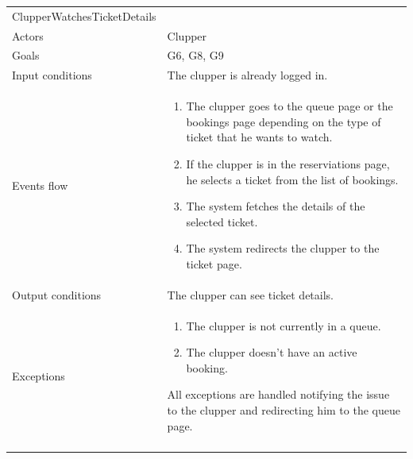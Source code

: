 \begin{longtable}[]{@{}
  >{\raggedright\arraybackslash}p{}
  >{\raggedright\arraybackslash}p{}@{}}
\toprule
ClupperWatchesTicketDetails & \\ \addlinespace
\midrule
\endhead
Actors & Clupper \\ \addlinespace
Goals & G6, G8, G9 \\ \addlinespace
Input conditions & The clupper is already logged in. \\ \addlinespace
Events flow & \begin{enumerate}\vspace{-1.35\baselineskip}
    \item The clupper goes to the queue page or the bookings page depending on the type of ticket that he wants to watch.
    \item If the clupper is in the reserviations page, he selects a ticket from the list of bookings.
    \item The system fetches the details of the selected ticket.
    \item The system redirects the clupper to the ticket page. 
\vspace{-1.0\baselineskip}\end{enumerate} \\ \addlinespace
Output conditions & The clupper can see ticket details. \\ \addlinespace
Exceptions & \begin{enumerate}\vspace{-1.35\baselineskip}
\item The clupper is not currently in a queue. 
\item The clupper doesn't have an active booking.
\end{enumerate} All exceptions are handled notifying the issue to the clupper and redirecting him to the queue page. \\ \addlinespace
\bottomrule
\end{longtable}

